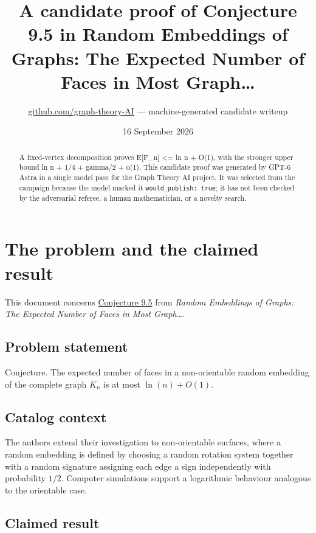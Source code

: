 \documentclass[
  11pt,
  a4paper,
]{article}
\title{A candidate proof of Conjecture 9.5 in Random Embeddings of
Graphs: The Expected Number of Faces in Most Graph\ldots{}}
\author{\href{https://github.com/graph-theory-AI}{github.com/graph-theory-AI}
--- machine-generated candidate writeup}
\date{16 September 2026}
\begin{document}
\maketitle
\begin{abstract}
A fixed-vertex decomposition proves E{[}F\_n{]} \textless= ln n + O(1),
with the stronger upper bound ln n + 1/4 + gamma/2 + o(1). This
candidate proof was generated by GPT-6 Astra in a single model pass for
the Graph Theory AI project. It was selected from the campaign because
the model marked it \texttt{would\_publish:\ true}; it has not been
checked by the adversarial referee, a human mathematician, or a novelty
search.
\end{abstract}

\section{The problem and the claimed
result}\label{the-problem-and-the-claimed-result}

This document concerns
\href{https://graph-theory-ai.github.io/graph-conjectures/arxiv/2211.01032__03/}{Conjecture
9.5} from \emph{Random Embeddings of Graphs: The Expected Number of
Faces in Most Graph\ldots{}}.

\subsection{Problem statement}\label{problem-statement}

Conjecture. The expected number of faces in a non-orientable random
embedding of the complete graph \(K_{n}\) is at most \(\ln(n) + O(1)\).

\subsection{Catalog context}\label{catalog-context}

The authors extend their investigation to non-orientable surfaces, where
a random embedding is defined by choosing a random rotation system
together with a random signature assigning each edge a sign
independently with probability \(1/2\). Computer simulations support a
logarithmic behaviour analogous to the orientable case.

\subsection{Claimed result}\label{claimed-result}
\end{document}
